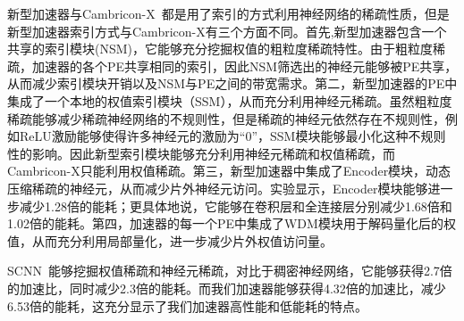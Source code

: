 新型加速器与Cambricon-X~\cite{zhang2016cambricon}都是用了索引的方式利用神经网络的稀疏性质，但是新型加速器索引方式与Cambricon-X有三个方面不同。首先,新型加速器包含一个共享的索引模块(NSM)，它能够充分挖掘权值的粗粒度稀疏特性。由于粗粒度稀疏，加速器的各个PE共享相同的索引，因此NSM筛选出的神经元能够被PE共享，从而减少索引模块开销以及NSM与PE之间的带宽需求。第二，新型加速器的PE中集成了一个本地的权值索引模块（SSM），从而充分利用神经元稀疏。虽然粗粒度稀疏能够减少稀疏神经网络的不规则性，但是稀疏的神经元依然存在不规则性，例如ReLU激励能够使得许多神经元的激励为“0”，SSM模块能够最小化这种不规则性的影响。因此新型索引模块能够充分利用神经元稀疏和权值稀疏，而Cambricon-X只能利用权值稀疏。第三，新型加速器中集成了Encoder模块，动态压缩稀疏的神经元，从而减少片外神经元访问。实验显示，Encoder模块能够进一步减少1.28倍的能耗；更具体地说，它能够在卷积层和全连接层分别减少1.68倍和1.02倍的能耗。第四，加速器的每一个PE中集成了WDM模块用于解码量化后的权值，从而充分利用局部量化，进一步减少片外权值访问量。

SCNN~\cite{angshuman2017scnn}能够挖掘权值稀疏和神经元稀疏，对比于稠密神经网络，它能够获得2.7倍的加速比，同时减少2.3倍的能耗。而我们加速器能够获得4.32倍的加速比，减少6.53倍的能耗，这充分显示了我们加速器高性能和低能耗的特点。


